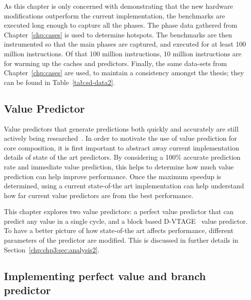 As this chapter is only concerned with demonstrating that the new hardware modifications outperform the current implementation, the benchmarks are executed long enough to capture all the phases.
The phase data gathered from Chapter~\ref{chp:cases} is used to determine hotspots.
The benchmarks are then instrumented so that the main phases are captured, and executed for at least 100 million instructions.
Of that 100 million instructions, 10 million instructions are for warming up the caches and predictors.
Finally, the same data-sets from Chapter~\ref{chp:cases} are used, to maintain a consistency amongst the thesis; they can be found in Table~\ref{tab:sd-data2}.

\subsection{Value Predictor}

Value predictors that generate predictions both quickly and accurately are still actively being researched~\cite{peraisVTAGE2014,peraisBeBop2015,sheikh2017value}.
In order to motivate the use of value prediction for core composition, it is first important to abstract away current implementation details of state of the art predictors.
By considering a 100\% accurate prediction rate and immediate value prediction, this helps to determine how much value prediction can help improve performance.
Once the maximum speedup is determined, using a current state-of-the art implementation can help understand how far current value predictors are from the best performance.

This chapter explores two value predictors: a perfect value predictor that can predict any value in a single cycle, and a block based D-VTAGE~\cite{peraisBeBop2015} value predictor.
To have a better picture of how state-of-the art affects performance, different parameters of the predictor are modified.
This is discussed in further details in Section~\ref{chp:chp3:sec:analysis2}.

\subsection{Implementing perfect value and branch predictor}

